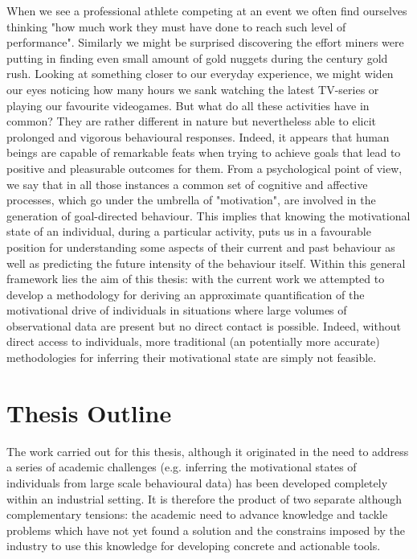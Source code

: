 When we see a professional athlete competing at an event we often find ourselves thinking "how much work they must have done to reach such level of performance". Similarly we might be surprised discovering the effort miners were putting in finding even small amount of gold nuggets during the  century gold rush. Looking at something closer to our everyday experience, we might widen our eyes noticing how many hours we sank watching the latest TV-series or playing our favourite videogames. But what do all these activities have in common? They are rather different in nature but nevertheless able to elicit prolonged and vigorous behavioural responses. Indeed, it appears that human beings are capable of remarkable feats when trying to achieve goals that lead to positive and pleasurable outcomes for them. From a psychological point of view, we say that in all those instances a common set of cognitive and affective processes, which go under the umbrella of "motivation", are involved in the generation of goal-directed behaviour. This implies that knowing the motivational state of an individual, during a particular activity, puts us in a favourable position for understanding some aspects of their current and past behaviour as well as  predicting the future intensity of the behaviour itself. Within this general framework lies the aim of this thesis: with the current work we attempted to develop a methodology for deriving an approximate quantification of the motivational drive of individuals in situations where large volumes of observational data are present but no direct contact is possible. Indeed, without direct access to individuals, more traditional (an potentially more accurate) methodologies for inferring their motivational state are simply not feasible.

\section*{Thesis Outline}
The work carried out for this thesis, although it originated in the need to address a series of academic challenges (e.g. inferring the motivational states of individuals from large scale behavioural data) has been developed completely within an industrial setting. It is therefore the product of two separate although complementary tensions: the academic need to advance knowledge and tackle problems which have not yet found a solution and the constrains imposed by the industry to use this knowledge for developing concrete and actionable tools.

